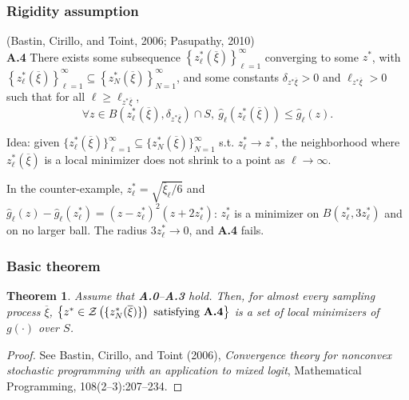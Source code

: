 \documentclass[aspectratio=169]{beamer}
\newtheorem{theo}{Theorem}
\begin{document}
\begin{frame}
\frametitle{Rigidity assumption}

(Bastin, Cirillo, and Toint, 2006; Pasupathy, 2010)\\
\textbf{A.4}
There exists some subsequence $\left\lbrace z^*_{\ell} (\overline{\xi}) \right\rbrace_{\ell = 1}^{\infty}$ converging to some $z^*$, with $\left\lbrace z^*_{\ell} (\overline{\xi}) \right\rbrace_{\ell = 1}^{\infty} \subseteq \left\lbrace z^*_{N} (\overline{\xi}) \right\rbrace_{N = 1}^{\infty}$, and some constants $\delta_{z^*\overline{\xi}} >0$ and $\ell_{z^* \overline{\xi}} > 0$ such that for all $\ell \geq \ell_{ z^* \overline{\xi}}$,
\[
\forall z \in B\left( z_{\ell}^*(\overline{\xi}), \delta_{z^*
	\overline{\xi}} \right) \cap S, \  \hat{g}_{\ell} \left(
z_{\ell}^*(\overline{\xi}) \right) \leq \hat{g}_{\ell}(z).
\]

\mbox{}

{\blue Idea:} given $\lbrace z^*_{\ell} (\overline{\xi}) \rbrace_{\ell = 1}^{\infty} \subseteq \lbrace z^*_{N} (\overline{\xi}) \rbrace_{N = 1}^{\infty}$ s.t. $z^*_{\ell} \rightarrow z^*$, the neighborhood where $z_{\ell}^*(\overline{\xi})$ is a local minimizer does not shrink to a point as $\ell \rightarrow \infty$.

\mbox{}

{\blue In the counter-example}, $z_\ell^* = \sqrt{\bar{\xi}_\ell/6}$ and $\hat{g}_\ell(z) - \hat{g}_\ell(z_\ell^*) = (z - z_\ell^*)^2 (z + 2z_\ell^*)$: $z_\ell^*$ is a minimizer on $B(z_\ell^*, 3z_\ell^*)$ and on no larger ball. The radius $3z_\ell^* \rightarrow 0$, and \textbf{A.4} fails.

\end{frame}

\begin{frame}
\frametitle{Basic theorem}


\begin{theo}
\label{th:basic_second_order}
Assume that \textbf{A.0}--\textbf{A.3} hold.
Then, for almost every sampling process $\overline{\xi}$,
$\left \lbrace z^* \in \mathcal{Z}\left(\lbrace
    z^*_N(\overline{\xi})\rbrace\right) \text{ satisfying
    \textbf{A.4}} \right \rbrace$ is a set of local minimizers of $g(\cdot)$ over $S$.
\end{theo}

\begin{proof}
See Bastin, Cirillo, and Toint (2006), {\sl Convergence theory for
	nonconvex stochastic programming with an application to mixed logit},
Mathematical Programming, 108(2--3):207--234.
\end{proof}

\end{frame}
\end{document}
